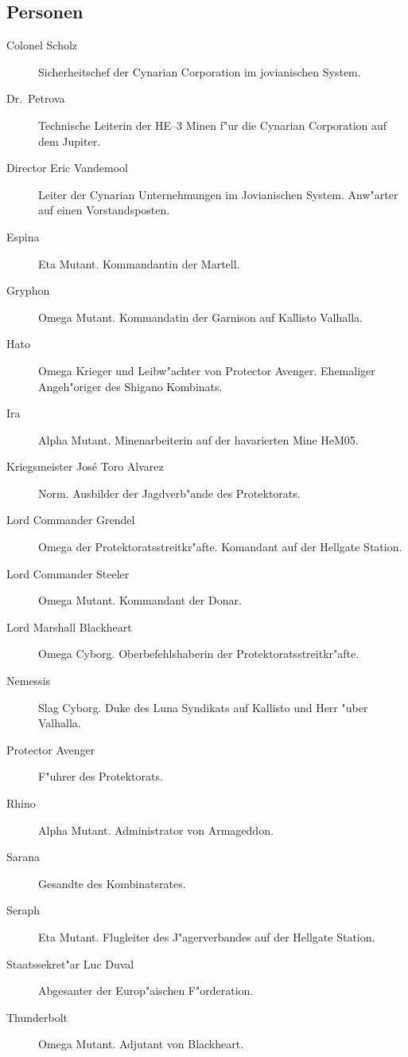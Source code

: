 \begin{appendices}
\section{Personen}

\begin{description}
\item [Colonel Scholz] Sicherheitschef der Cynarian Corporation im jovianischen System.
\item [Dr.~Petrova] Technische Leiterin der HE--3 Minen f"ur die Cynarian Corporation auf dem Jupiter.
\item [Director Eric Vandemool] Leiter der Cynarian Unternehmungen im Jovianischen System. Anw"arter auf einen
      Vorstandsposten.
\item [Espina] Eta Mutant. Kommandantin der Martell.
\item [Gryphon] Omega Mutant. Kommandatin der Garnison auf Kallisto Valhalla.
\item [Hato] Omega Krieger und Leibw"achter von Protector Avenger. Ehemaliger Angeh"origer des Shigano Kombinats.
\item [Ira] Alpha Mutant. Minenarbeiterin auf der havarierten Mine HeM05.
\item [Kriegsmeister Jos\'{e} \frqq{}Toro\flqq{} Alvarez] Norm. Ausbilder der Jagdverb"ande des Protektorats.
\item [Lord Commander Grendel] Omega der Protektoratsstreitkr"afte. Komandant auf der Hellgate Station.
\item [Lord Commander Steeler] Omega Mutant. Kommandant der Donar.
\item [Lord Marshall Blackheart] Omega Cyborg. Oberbefehlshaberin der Protektoratsstreitkr"afte.
\item [Nemessis] Slag Cyborg. Duke des Luna Syndikats auf Kallisto und Herr "uber Valhalla.
\item [Protector Avenger] F"uhrer des Protektorats.
\item [Rhino] Alpha Mutant. Administrator von Armageddon.
\item [Sarana] Gesandte des Kombinatsrates.
\item [Seraph] Eta Mutant. Flugleiter des J"agerverbandes auf der Hellgate Station.
\item [Staatssekret"ar Luc Duval] Abgesanter der Europ"aischen F"orderation.
\item [Thunderbolt] Omega Mutant. Adjutant von Blackheart.
\end{description}

\end{appendices}